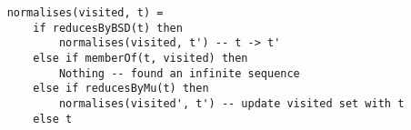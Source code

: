 \begin{lstlisting}
    normalises(visited, t) = 
        if reducesByBSD(t) then
            normalises(visited, t') -- t -> t'
        else if memberOf(t, visited) then
            Nothing -- found an infinite sequence
        else if reducesByMu(t) then
            normalises(visited', t') -- update visited set with t
        else t
\end{lstlisting}